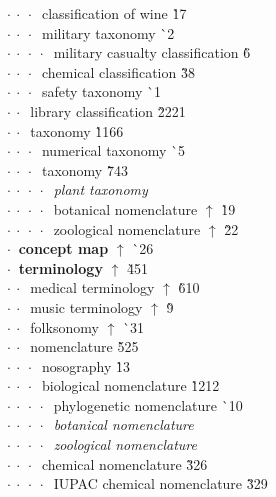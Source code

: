\begin{tabbing}
$\cdot\:\cdot\:\cdot\:$  classification of wine  \` 1{\raisebox{.4\height}{\scalebox{.6}{+}}}7\\
$\cdot\:\cdot\:\cdot\:$  military taxonomy  \` {\raisebox{.4\height}{\scalebox{.6}{+}}}2\\
$\cdot\:\cdot\:\cdot\:\cdot\:$  military casualty classification  \` 6\\
$\cdot\:\cdot\:\cdot\:$  chemical classification  \` 3{\raisebox{.4\height}{\scalebox{.6}{+}}}8\\
$\cdot\:\cdot\:\cdot\:$  safety taxonomy  \` {\raisebox{.4\height}{\scalebox{.6}{+}}}1\\
$\cdot\:\cdot\:$  library classification  \` 22{\raisebox{.4\height}{\scalebox{.6}{+}}}21\\
$\cdot\:\cdot\:$  taxonomy  \` 11{\raisebox{.4\height}{\scalebox{.6}{+}}}66\\
$\cdot\:\cdot\:\cdot\:$  numerical taxonomy  \` {\raisebox{.4\height}{\scalebox{.6}{+}}}5\\
$\cdot\:\cdot\:\cdot\:$  taxonomy  \` 7{\raisebox{.4\height}{\scalebox{.6}{+}}}43\\
$\cdot\:\cdot\:\cdot\:\cdot\:$  \textit{plant taxonomy}\\
$\cdot\:\cdot\:\cdot\:\cdot\:$  botanical nomenclature $\uparrow$ \` 1{\raisebox{.4\height}{\scalebox{.6}{+}}}9\\
$\cdot\:\cdot\:\cdot\:\cdot\:$  zoological nomenclature $\uparrow$ \` 2{\raisebox{.4\height}{\scalebox{.6}{+}}}2\\
$\cdot\:$  \textbf{concept map} $\uparrow$ \` {\raisebox{.4\height}{\scalebox{.6}{+}}}26\\
$\cdot\:$  \textbf{terminology} $\uparrow$ \` 4{\raisebox{.4\height}{\scalebox{.6}{+}}}51\\
$\cdot\:\cdot\:$  medical terminology $\uparrow$ \` 6{\raisebox{.4\height}{\scalebox{.6}{+}}}10\\
$\cdot\:\cdot\:$  music terminology $\uparrow$ \` 9\\
$\cdot\:\cdot\:$  folksonomy $\uparrow$ \` {\raisebox{.4\height}{\scalebox{.6}{+}}}31\\
$\cdot\:\cdot\:$  nomenclature  \` 5{\raisebox{.4\height}{\scalebox{.6}{+}}}25\\
$\cdot\:\cdot\:\cdot\:$  nosography  \` 1{\raisebox{.4\height}{\scalebox{.6}{+}}}3\\
$\cdot\:\cdot\:\cdot\:$  biological nomenclature  \` 12{\raisebox{.4\height}{\scalebox{.6}{+}}}12\\
$\cdot\:\cdot\:\cdot\:\cdot\:$  phylogenetic nomenclature  \` {\raisebox{.4\height}{\scalebox{.6}{+}}}10\\
$\cdot\:\cdot\:\cdot\:\cdot\:$  \textit{botanical nomenclature}\\
$\cdot\:\cdot\:\cdot\:\cdot\:$  \textit{zoological nomenclature}\\
$\cdot\:\cdot\:\cdot\:$  chemical nomenclature  \` 3{\raisebox{.4\height}{\scalebox{.6}{+}}}26\\
$\cdot\:\cdot\:\cdot\:\cdot\:$  IUPAC chemical nomenclature  \` 3{\raisebox{.4\height}{\scalebox{.6}{+}}}29\\
\end{tabbing}

